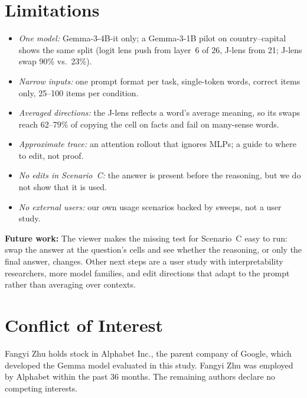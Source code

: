 \documentclass{vgtc}       %
\newcommand{\LL}{logit lens}
\newcommand{\JL}{J-lens}
\begin{document}
\section{Limitations}
\begin{itemize}[nosep, leftmargin=*]
  \item \emph{One model:} Gemma-3-4B-it only; a Gemma-3-1B pilot on country--capital shows the same split
        (\LL{} push from layer~6 of 26, \JL{} from 21; \JL{} swap 90\% vs.\ 23\%).
  \item \emph{Narrow inputs:} one prompt format per task, single-token words, correct items only, 25--100 items per
        condition.
  \item \emph{Averaged directions:} the \JL{} reflects a word's average meaning, so its swaps reach 62--79\% of copying
        the cell on facts and fail on many-sense words.
  \item \emph{Approximate trace:} an attention rollout that ignores MLPs; a guide to where to edit, not proof.
  \item \emph{No edits in Scenario~C:} the answer is present before the reasoning, but we do not show that it is used.
  \item \emph{No external users:} our own usage scenarios backed by sweeps, not a user study.
\end{itemize}
\textbf{Future work:} The viewer makes the missing test for Scenario~C easy to run: swap the answer at the
question's cells and see whether the reasoning, or only the final answer, changes. Other next steps are a user
study with interpretability researchers, more model families, and edit directions that adapt to the prompt rather
than averaging over contexts.




\section*{Conflict of Interest}
Fangyi Zhu holds stock in Alphabet Inc., the parent company of Google, which developed the Gemma model evaluated in this study.
Fangyi Zhu was employed by Alphabet within the past 36 months.
The remaining authors declare no competing interests.




\end{document}
